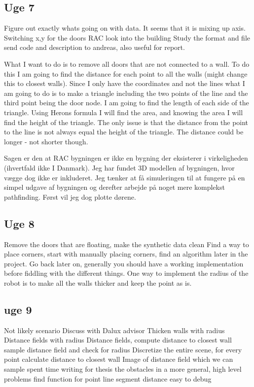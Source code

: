 \subsection{Uge 7}
Figure out exactly whats going on with data.
It seems that it is mixing up axis.
Switching x,y for the doors
RAC look into the building 
Study the format and file
send code and description to andreas, also useful for report.

What I want to do is to remove all doors that are not connected to a wall. To do this I am going to find the distance for each point to all the walls (might change this to closest walls). Since I only have the coordinates and not the lines what I am going to do is to make a triangle including the two points of the line and the third point being the door node. I am going to find the length of each side of the triangle. Using Herons formula I will find the area, and knowing the area I will find the height of the triangle. The only issue is that the distance from the point to the line is not always equal the height of the triangle. The distance could be longer - not shorter though.

Sagen er den at RAC bygningen er ikke en bygning der eksisterer i virkeligheden (ihvertfald ikke I Danmark). Jeg har fundet 3D modellen af bygningen, hvor vægge dog ikke er inkluderet. Jeg tænker at få simuleringen til at fungere på en simpel udgave af bygningen og derefter arbejde på noget mere komplekst pathfinding. Først vil jeg dog plotte dørene.

\subsection{Uge 8}
Remove the doors that are floating, make the synthetic data clean
Find a way to place corners, start with manually placing corners, find an algorithm later in the project.
Go back later on, generally you should have a working implementation before fiddling with the  different things.
One way to implement the radius of the robot is to make all the walls thicker and keep the point as is.

\subsection{uge 9}
Not likely scenario 
Discuss with Dalux advisor 
Thicken walls with radius
Distance fields with radius
Distance fields, compute distance to closest wall
sample distance field and check for radius
Discretize the entire scene, for every point calculate distance to closest wall
Image of distance field which we can sample
spent time writing for thesis the obstacles in a more general, high level problems
find function for point line segment distance 
easy to debug

